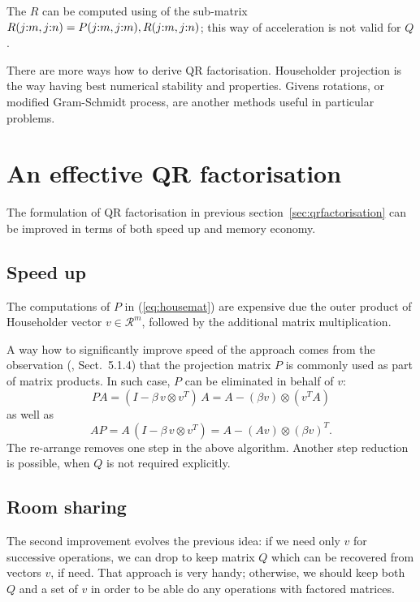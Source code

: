 \begin{refsection}
The $R$ can be computed using of the sub-matrix
$R(j{:}m,j{:}n) = P(j{:}m,j{:}m),R(j{:}m,j{:}n)$;
this way of acceleration is not valid for $Q$.

There are more ways how to derive QR factorisation.
Householder projection is the way having best numerical
stability and properties. Givens rotations, or modified
Gram-Schmidt process, are another methods
useful in particular problems.


\section{An effective QR factorisation}

The formulation of QR factorisation in previous section~\ref{sec:qrfactorisation}
can be improved in terms of both speed up and memory economy.

\subsection{Speed up}
\label{sec:speedup}

The computations of $P$ in (\ref{eq:housemat}) are expensive due
the outer product of
Householder vector $v \in \mathcal{R}^m$, followed by
the additional matrix multiplication.

A way how to significantly improve speed of the approach comes
from the observation (\cite{golub2013matrix}, Sect.~5.1.4)
that the projection matrix $P$ is commonly used as part of
matrix products. In such case, $P$ can be eliminated
in behalf of $v$:
\begin{equation} \label{eq:golub514a}
  PA = (I - \beta \, v \otimes v^T) \, A = A - (\beta v) \otimes (v^T \! A)
\end{equation}
as well as
\begin{equation} \label{eq:golub514b}
  A P = A \, (I - \beta \, v \otimes v^T) = A - (A v) \otimes (\beta v)^T.
\end{equation}
The re-arrange removes one step in the above algorithm.
Another step reduction is possible, when $Q$ is not required explicitly.

\subsection{Room sharing}
\label{subsec:memshare}

The second improvement evolves the previous idea:
if we need only $v$ for successive operations, we can drop
to keep matrix $Q$ which can be recovered from vectors $v$,
if need.
That approach is very handy;
otherwise, we should keep both $Q$ and a set of $v$ in order
to be able do any operations with factored matrices.


\end{refsection}
